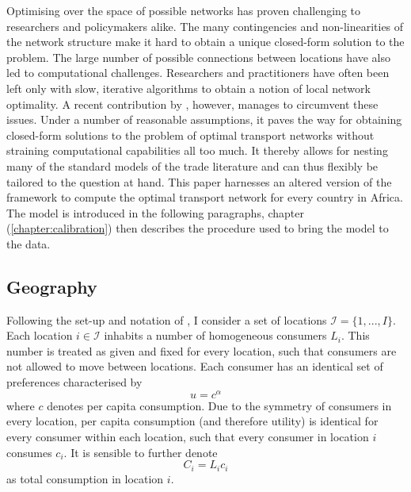 \documentclass[11pt, oneside]{article}   	%
\let\oldref\ref
\renewcommand{\ref}[1]{(\oldref{#1})}
\begin{document}
Optimising over the space of possible networks has proven challenging to researchers and policymakers alike. The many contingencies and non-linearities of the network structure make it hard to obtain a unique closed-form solution to the problem. The large number of possible connections between locations have also led to computational challenges. Researchers and practitioners have often been left only with slow, iterative algorithms to obtain a notion of local network optimality. A recent contribution by \cite{Fajgelbaum_OptimalTransportNetworks_2017}, however, manages to circumvent these issues. Under a number of reasonable assumptions, it paves the way for obtaining closed-form solutions to the problem of optimal transport networks without straining computational capabilities all too much. It thereby allows for nesting many of the standard models of the trade literature and can thus flexibly be tailored to the question at hand. This paper harnesses an altered version of the \citeauthor{Fajgelbaum_OptimalTransportNetworks_2017} framework to compute the optimal transport network for every country in Africa. The model is introduced in the following paragraphs, chapter \ref{chapter:calibration} then describes the procedure used to bring the model to the data.

\subsection{Geography}

Following the set-up and notation of \cite{Fajgelbaum_OptimalTransportNetworks_2017}, I consider a set of locations $\mathcal{I} =\{ 1,...,I\}$. Each location $i \in \mathcal{I}$ inhabits a number of homogeneous consumers $L_{i}$. This number is treated as given and fixed for every location, such that consumers are not allowed to move between locations. Each consumer has an identical set of preferences characterised by
\begin{equation*}
  u = c^{\alpha}
\end{equation*}
where $c$ denotes per capita consumption. Due to the symmetry of consumers in every location, per capita consumption (and therefore utility) is identical for every consumer within each location, such that every consumer in location $i$ consumes $c_{i}$. It is sensible to further denote
\begin{equation*}
  C_{i} = L_{i}c_{i}
\end{equation*}
as total consumption in location $i$.
\end{document}
